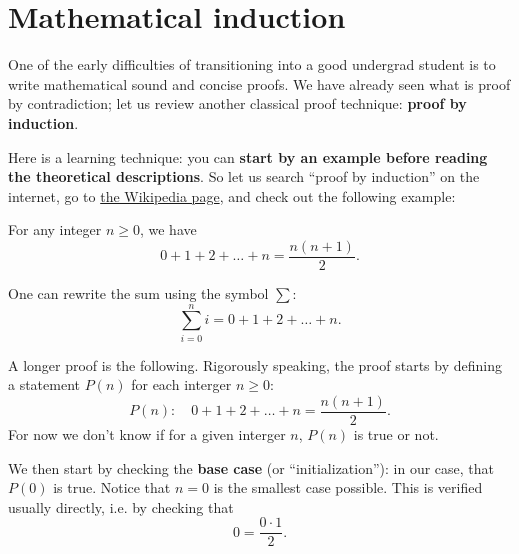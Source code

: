 \documentclass[
	fontsize=10pt, %
	twoside=true, %
	secnumdepth=1, %
	numbers=noenddot, %
]{kaobook}
\begin{document}
\section{Mathematical induction}
One of the early difficulties of transitioning into a good undergrad student is to write mathematical sound and concise proofs. We have already seen what is proof by contradiction; let us review another classical proof technique: \textbf{proof by induction}.

Here is a learning technique: you can \textbf{start by an example before reading the theoretical descriptions}. So let us search ``proof by induction'' on the internet, go to \href{https://en.wikipedia.org/wiki/Mathematical_induction}{the Wikipedia page}, and check out the following example:

\begin{example}
For any integer $n\geq 0$, we have
\begin{equation*}
0+1+2+\dots+n=\frac{n(n+1)}{2}.
\end{equation*}
\end{example}

One can rewrite the sum using the symbol $\sum$:
\begin{equation*}
\sum\limits_{i=0}^{n}i=0+1+2+\dots+n.
\end{equation*}

A longer proof is the following. Rigorously speaking, the proof starts by defining a statement $P(n)$ for each interger $n\geq 0$:
\begin{equation*}
P(n):\quad 0+1+2+\dots+n=\frac{n(n+1)}{2}.
\end{equation*}
For now we don't know if for a given interger $n$, $P(n)$ is true or not.

We then start by checking the \textbf{base case} (or ``initialization''): in our case, that $P(0)$ is true. Notice that $n=0$ is the smallest case possible. This is verified usually directly, i.e. by checking that
\begin{equation*}
0=\frac{0\cdot 1}{2}.
\end{equation*}
\end{document}

